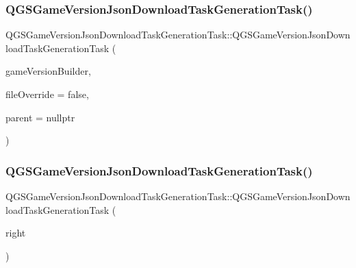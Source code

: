 \subsubsection{\texorpdfstring{Q\+G\+S\+Game\+Version\+Json\+Download\+Task\+Generation\+Task()}{QGSGameVersionJsonDownloadTaskGenerationTask()}\hspace{0.1cm}{\footnotesize\ttfamily [1/3]}}
{\footnotesize\ttfamily Q\+G\+S\+Game\+Version\+Json\+Download\+Task\+Generation\+Task\+::\+Q\+G\+S\+Game\+Version\+Json\+Download\+Task\+Generation\+Task (\begin{DoxyParamCaption}\item[{\mbox{\hyperlink{class_q_g_s_game_version_builder}{Q\+G\+S\+Game\+Version\+Builder}} $\ast$}]{game\+Version\+Builder,  }\item[{bool}]{file\+Override = {\ttfamily false},  }\item[{Q\+Object $\ast$}]{parent = {\ttfamily nullptr} }\end{DoxyParamCaption})}

\mbox{\label{class_q_g_s_game_version_json_download_task_generation_task_af4be0335e2400e4faabf0999daf9da72}} 
\subsubsection{\texorpdfstring{Q\+G\+S\+Game\+Version\+Json\+Download\+Task\+Generation\+Task()}{QGSGameVersionJsonDownloadTaskGenerationTask()}\hspace{0.1cm}{\footnotesize\ttfamily [2/3]}}
{\footnotesize\ttfamily Q\+G\+S\+Game\+Version\+Json\+Download\+Task\+Generation\+Task\+::\+Q\+G\+S\+Game\+Version\+Json\+Download\+Task\+Generation\+Task (\begin{DoxyParamCaption}\item[{const \mbox{\hyperlink{class_q_g_s_game_version_json_download_task_generation_task}{Q\+G\+S\+Game\+Version\+Json\+Download\+Task\+Generation\+Task}} \&}]{right }\end{DoxyParamCaption})\hspace{0.3cm}{\ttfamily [delete]}}

